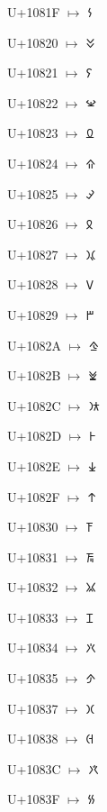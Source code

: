 {\noindent U+1081F  $\mapsto$ {\cyfont 𐠟}\par
\noindent U+10820  $\mapsto$ {\cyfont 𐠠}\par
\noindent U+10821  $\mapsto$ {\cyfont 𐠡}\par
\noindent U+10822  $\mapsto$ {\cyfont 𐠢}\par
\noindent U+10823  $\mapsto$ {\cyfont 𐠣}\par
\noindent U+10824  $\mapsto$ {\cyfont 𐠤}\par
\noindent U+10825  $\mapsto$ {\cyfont 𐠥}\par
\noindent U+10826  $\mapsto$ {\cyfont 𐠦}\par
\noindent U+10827  $\mapsto$ {\cyfont 𐠧}\par
\noindent U+10828  $\mapsto$ {\cyfont 𐠨}\par
\noindent U+10829  $\mapsto$ {\cyfont 𐠩}\par
\noindent U+1082A  $\mapsto$ {\cyfont 𐠪}\par
\noindent U+1082B  $\mapsto$ {\cyfont 𐠫}\par
\noindent U+1082C  $\mapsto$ {\cyfont 𐠬}\par
\noindent U+1082D  $\mapsto$ {\cyfont 𐠭}\par
\noindent U+1082E  $\mapsto$ {\cyfont 𐠮}\par
\noindent U+1082F  $\mapsto$ {\cyfont 𐠯}\par
\noindent U+10830  $\mapsto$ {\cyfont 𐠰}\par
\noindent U+10831  $\mapsto$ {\cyfont 𐠱}\par
\noindent U+10832  $\mapsto$ {\cyfont 𐠲}\par
\noindent U+10833  $\mapsto$ {\cyfont 𐠳}\par
\noindent U+10834  $\mapsto$ {\cyfont 𐠴}\par
\noindent U+10835  $\mapsto$ {\cyfont 𐠵}\par
\noindent U+10837  $\mapsto$ {\cyfont 𐠷}\par
\noindent U+10838  $\mapsto$ {\cyfont 𐠸}\par
\noindent U+1083C  $\mapsto$ {\cyfont 𐠼}\par
\noindent U+1083F  $\mapsto$ {\cyfont 𐠿}\par
}

